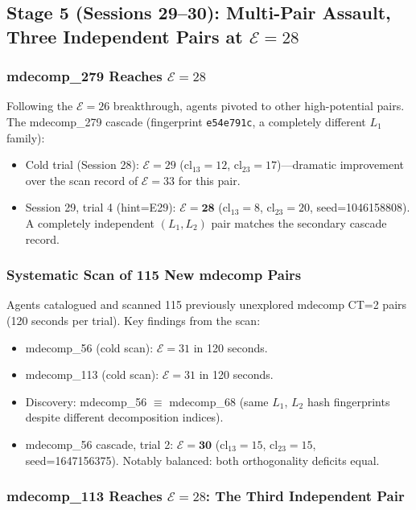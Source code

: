 \documentclass[11pt,a4paper]{article}
\theoremstyle{remark}
\newcommand{\cl}{\mathrm{cl}}
\newcommand{\E}{\mathcal{E}}
\begin{document}
\subsection{Stage 5 (Sessions 29--30): Multi-Pair Assault, Three Independent Pairs at $\E=28$}

\subsubsection{mdecomp\_279 Reaches $\E=28$}

Following the $\E=26$ breakthrough, agents pivoted to other high-potential pairs. The
mdecomp\_279 cascade (fingerprint \texttt{e54e791c}, a completely different $L_1$ family):

\begin{itemize}[noitemsep]
  \item Cold trial (Session 28): $\E=29$ ($\cl_{13}=12$, $\cl_{23}=17$)---dramatic
    improvement over the scan record of $\E=33$ for this pair.
  \item Session 29, trial 4 (hint=E29): $\E=\mathbf{28}$ ($\cl_{13}=8$, $\cl_{23}=20$,
    seed=1046158808). A completely independent $(L_1,L_2)$ pair matches the secondary
    cascade record.
\end{itemize}

\subsubsection{Systematic Scan of 115 New mdecomp Pairs}

Agents catalogued and scanned 115 previously unexplored mdecomp CT=2 pairs
(120 seconds per trial). Key findings from the scan:
\begin{itemize}[noitemsep]
  \item mdecomp\_56 (cold scan): $\E=31$ in 120 seconds.
  \item mdecomp\_113 (cold scan): $\E=31$ in 120 seconds.
  \item Discovery: mdecomp\_56 $\equiv$ mdecomp\_68 (same $L_1$, $L_2$ hash fingerprints
    despite different decomposition indices).
  \item mdecomp\_56 cascade, trial 2: $\E=\mathbf{30}$ ($\cl_{13}=15$, $\cl_{23}=15$,
    seed=1647156375). Notably balanced: both orthogonality deficits equal.
\end{itemize}

\subsubsection{mdecomp\_113 Reaches $\E=28$: The Third Independent Pair}
\end{document}
